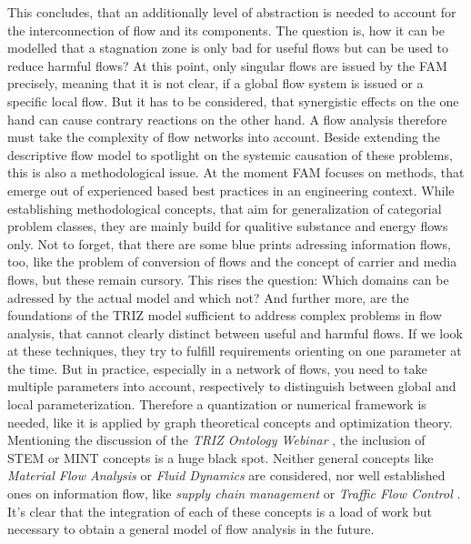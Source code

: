 \documentclass[a4paper,11pt]{article}
\begin{document}
        This concludes, that an additionally level of abstraction is needed to 
        account for the interconnection of flow and its components. The 
        question is, how it can be modelled that a stagnation zone is only bad 
        for useful flows but can be used to reduce harmful flows? At this point,
        only singular flows are issued by the FAM precisely, meaning that it is
        not clear, if a global flow system is issued or a specific local flow.
        But it has to be considered, that synergistic effects on the one hand 
        can cause contrary reactions on the other hand. A flow analysis 
        therefore must take the complexity of flow networks into account. 
        Beside extending the descriptive flow model to spotlight on the 
        systemic causation of these problems, this is also a methodological 
        issue. At the moment FAM focuses on methods, that emerge out of 
        experienced based best practices in an engineering context. While 
        establishing methodological concepts, that aim for generalization of 
        categorial problem classes, they are mainly build for qualitive 
        substance and energy flows only. Not to forget, that there are some 
        blue prints adressing information flows, too, like the problem of 
        conversion of flows and the concept of carrier and media flows, but 
        these remain cursory. This rises the question: Which domains can be 
        adressed by the actual model and which not? And further more, are the 
        foundations of the TRIZ model sufficient to address complex problems in
        flow analysis, that cannot clearly distinct between useful and harmful 
        flows. If we look at these techniques, they try to fulfill requirements
        orienting on one parameter at the time. But in practice, especially in 
        a network of flows, you need to take multiple parameters into account, 
        respectively to distinguish between global and local parameterization. 
        Therefore a quantization or numerical framework is needed, like it is 
        applied by graph theoretical concepts and optimization theory. 
        \cite{FN} Mentioning the discussion of the \emph{TRIZ Ontology Webinar}
        \cite{TOW}, the inclusion of STEM or MINT concepts is a huge black spot. 
        Neither general concepts like \emph{Material Flow Analysis} \cite{MFA} 
        or \emph{Fluid Dynamics} \cite{FD} are considered, nor well established 
        ones on information flow, like \emph{supply chain management} or 
        \emph{Traffic Flow Control} \cite{TF}. It's clear that the integration 
        of each of these concepts is a load of work but necessary to obtain a 
        general model of flow analysis in the future.
\end{document}

